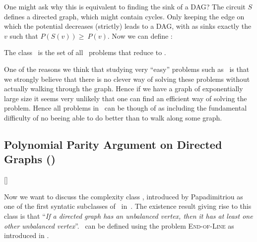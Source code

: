 
One might ask why this is equivalent to finding the sink of a DAG\@?
The circuit $S$ defines a directed graph, which might contain cycles.
Only keeping the edge on which the potential decreases (strictly) leads to a DAG, with as sinks exactly the $v$ such that $P(S(v)) \geq\ P(v)$. Now we can
define \PLS{}:

\begin{definition}
    The class \PLS\ is the set of all \TFNP\ problems that reduce to \Localopt.
\end{definition}

One of the reasons we think that studying very ``easy'' problems such as \PLS\ is that we strongly believe that there is no clever way of solving these
problems
without actually walking through the graph.
Hence if we have a graph of exponentially large size it seems very unlikely that one can find an efficient way of solving the problem.
Hence all problems in \PLS\ can be though of as including the fundamental difficulty of no beeing able to do better than to walk along some graph.

\subsection{Polynomial Parity Argument on Directed Graphs (\PPAD)}[\PPAD]

Now we want to discuss the complexity class \PPAD, introduced by Papadimitriou as one of the first syntatic subclasses of \TFNP\
in~.
The existence result giving rise to this class is that ``\textit{If a directed graph has an unbalanced vertex, then it has at least one other unbalanced
    vertex}''.
\PPAD\ can be defined using the problem \textsc{End-of-Line} as introduced in .


